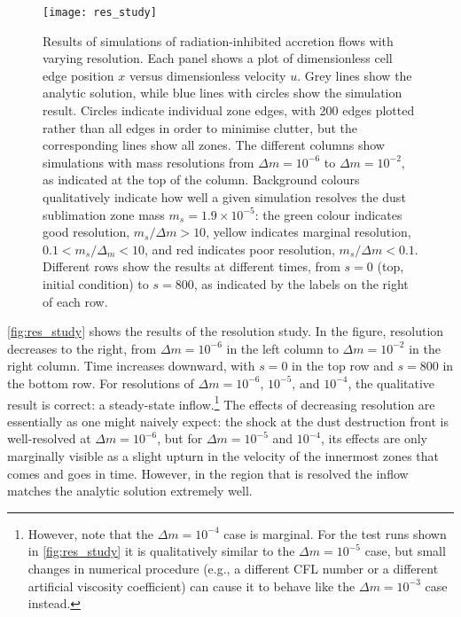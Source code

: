 \documentclass[useAMS,usenatbib]{mn2e}
\begin{document}
\begin{figure*}
\texttt{[image: res\_study]}
\caption{
\label{fig:res_study}
Results of simulations of radiation-inhibited accretion flows with varying resolution. Each panel shows a plot of dimensionless cell edge position $x$ versus dimensionless velocity $u$. Grey lines show the analytic solution, while blue lines with circles show the simulation result. Circles indicate individual zone edges, with 200 edges plotted rather than all edges in order to minimise clutter, but the corresponding lines show all zones. The different columns show simulations with mass resolutions from $\Delta m = 10^{-6}$ to $\Delta m = 10^{-2}$, as indicated at the top of the column. Background colours qualitatively indicate how well a given simulation resolves the dust sublimation zone mass $m_s = 1.9\times 10^{-5}$: the green colour indicates good resolution, $m_s / \Delta m > 10$, yellow indicates marginal resolution, $0.1 < m_s/\Delta_m < 10$, and red indicates poor resolution, $m_s / \Delta m < 0.1$. Different rows show the results at different times, from $s=0$ (top, initial condition) to $s = 800$, as indicated by the labels on the right of each row.
}
\end{figure*}

\autoref{fig:res_study} shows the results of the resolution study. In the figure, resolution decreases to the right, from $\Delta m = 10^{-6}$ in the left column to $\Delta m = 10^{-2}$ in the right column. Time increases downward, with $s=0$ in the top row and $s=800$ in the bottom row. For resolutions of $\Delta m = 10^{-6}$, $10^{-5}$, and $10^{-4}$, the qualitative result is correct: a steady-state inflow.\footnote{However, note that the $\Delta m = 10^{-4}$ case is marginal. For the test runs shown in \autoref{fig:res_study} it is qualitatively similar to the $\Delta m = 10^{-5}$ case, but small changes in numerical procedure (e.g., a different CFL number or a different artificial viscosity coefficient) can cause it to behave like the $\Delta m = 10^{-3}$ case instead.} The effects of decreasing resolution are essentially as one might naively expect: the shock at the dust destruction front is well-resolved at $\Delta m = 10^{-6}$, but for $\Delta m = 10^{-5}$ and $10^{-4}$, its effects are only marginally visible as a slight upturn in the velocity of the innermost zones that comes and goes in time. However, in the region that is resolved the inflow matches the analytic solution extremely well.
\end{document}
